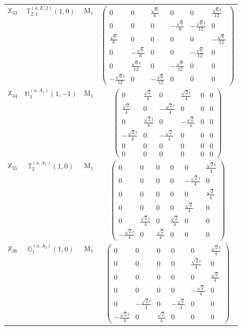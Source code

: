 \documentclass[fleqn,10pt,landscape]{article}
\begin{document}
\begin{itemize}
\begin{center}
\begin{longtable}{c|c|c|c}
$ \mathbb{X}_{33} $ & $\mathbb{T}_{2,1}^{(a,E,2)}(1,0)$ & M$_{1}$ & $\begin{pmatrix} 0 & 0 & \frac{\sqrt{6}}{6} & 0 & 0 & \frac{\sqrt{6} i}{12} \\ 0 & 0 & 0 & - \frac{\sqrt{6}}{6} & - \frac{\sqrt{6} i}{12} & 0 \\ \frac{\sqrt{6}}{6} & 0 & 0 & 0 & 0 & - \frac{\sqrt{6}}{12} \\ 0 & - \frac{\sqrt{6}}{6} & 0 & 0 & - \frac{\sqrt{6}}{12} & 0 \\ 0 & \frac{\sqrt{6} i}{12} & 0 & - \frac{\sqrt{6}}{12} & 0 & 0 \\ - \frac{\sqrt{6} i}{12} & 0 & - \frac{\sqrt{6}}{12} & 0 & 0 & 0 \end{pmatrix}$ \\
$ \mathbb{X}_{34} $ & $\mathbb{M}_{3}^{(a,A_{1})}(1,-1)$ & M$_{1}$ & $\begin{pmatrix} 0 & \frac{\sqrt{2}}{4} & 0 & \frac{\sqrt{2} i}{4} & 0 & 0 \\ \frac{\sqrt{2}}{4} & 0 & - \frac{\sqrt{2} i}{4} & 0 & 0 & 0 \\ 0 & \frac{\sqrt{2} i}{4} & 0 & - \frac{\sqrt{2}}{4} & 0 & 0 \\ - \frac{\sqrt{2} i}{4} & 0 & - \frac{\sqrt{2}}{4} & 0 & 0 & 0 \\ 0 & 0 & 0 & 0 & 0 & 0 \\ 0 & 0 & 0 & 0 & 0 & 0 \end{pmatrix}$ \\
$ \mathbb{X}_{35} $ & $\mathbb{T}_{2}^{(a,A_{1})}(1,0)$ & M$_{1}$ & $\begin{pmatrix} 0 & 0 & 0 & 0 & 0 & \frac{\sqrt{2} i}{4} \\ 0 & 0 & 0 & 0 & - \frac{\sqrt{2} i}{4} & 0 \\ 0 & 0 & 0 & 0 & 0 & \frac{\sqrt{2}}{4} \\ 0 & 0 & 0 & 0 & \frac{\sqrt{2}}{4} & 0 \\ 0 & \frac{\sqrt{2} i}{4} & 0 & \frac{\sqrt{2}}{4} & 0 & 0 \\ - \frac{\sqrt{2} i}{4} & 0 & \frac{\sqrt{2}}{4} & 0 & 0 & 0 \end{pmatrix}$ \\
$ \mathbb{X}_{36} $ & $\mathbb{G}_{1}^{(a,A_{2})}(1,0)$ & M$_{1}$ & $\begin{pmatrix} 0 & 0 & 0 & 0 & 0 & \frac{\sqrt{2} i}{4} \\ 0 & 0 & 0 & 0 & \frac{\sqrt{2} i}{4} & 0 \\ 0 & 0 & 0 & 0 & 0 & \frac{\sqrt{2}}{4} \\ 0 & 0 & 0 & 0 & - \frac{\sqrt{2}}{4} & 0 \\ 0 & - \frac{\sqrt{2} i}{4} & 0 & - \frac{\sqrt{2}}{4} & 0 & 0 \\ - \frac{\sqrt{2} i}{4} & 0 & \frac{\sqrt{2}}{4} & 0 & 0 & 0 \end{pmatrix}$ \\

\end{longtable}
\end{center}
\end{itemize}
\end{document}
